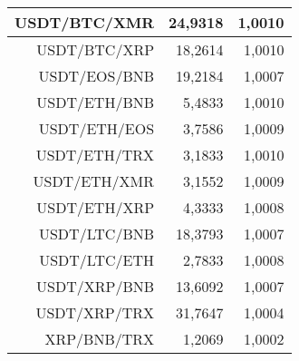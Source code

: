 \begin{table}
\begin{tabular}{|| r | r | r ||}
 \hline USDT/BTC/XMR & 24,9318 & 1,0010\\ 
 \hline USDT/BTC/XRP & 18,2614 & 1,0010\\ 
 \hline USDT/EOS/BNB & 19,2184 & 1,0007\\ 
 \hline USDT/ETH/BNB & 5,4833 & 1,0010\\ 
 \hline USDT/ETH/EOS & 3,7586 & 1,0009\\ 
 \hline USDT/ETH/TRX & 3,1833 & 1,0010\\ 
 \hline USDT/ETH/XMR & 3,1552 & 1,0009\\ 
 \hline USDT/ETH/XRP & 4,3333 & 1,0008\\ 
 \hline USDT/LTC/BNB & 18,3793 & 1,0007\\ 
 \hline USDT/LTC/ETH & 2,7833 & 1,0008\\ 
 \hline USDT/XRP/BNB & 13,6092 & 1,0007\\ 
 \hline USDT/XRP/TRX & 31,7647 & 1,0004\\ 
 \hline XRP/BNB/TRX & 1,2069 & 1,0002\\ 
 \hline
\end{tabular}
\end{table}
